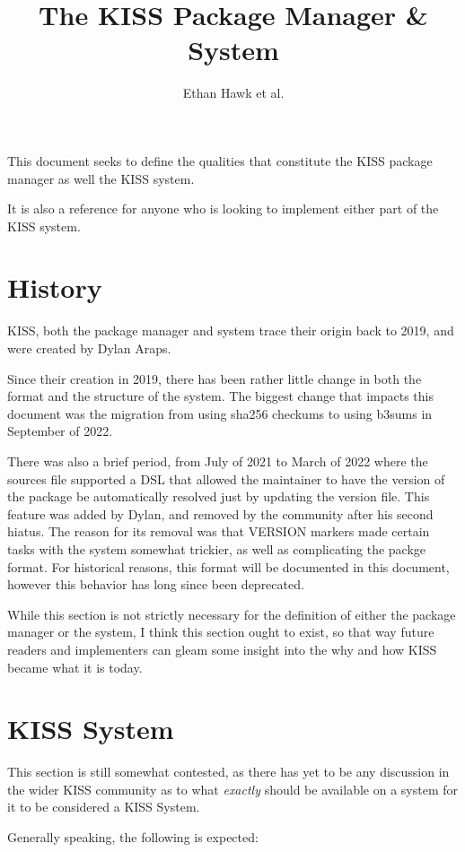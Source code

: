 \documentclass{article}
\title{The KISS Package Manager \& System}
\author{Ethan Hawk et al.}
\begin{document}
\maketitle
\tableofcontents

\newpage
This document seeks to define the qualities that constitute the
KISS package manager as well the KISS system.

It is also a reference for anyone who is looking to implement
either part of the KISS system.

\section{History}

KISS, both the package manager and system trace their origin back
to 2019, and were created by Dylan Araps.

Since their creation in 2019, there has been rather little change
in both the format and the structure of the system. The biggest
change that impacts this document was the migration from using
sha256 checkums to using b3sums in September of 2022.

There was also a brief period, from July of 2021 to March of 2022
where the sources file supported a DSL that allowed the maintainer
to have the version of the package be automatically resolved just
by updating the version file. This feature was added by Dylan,
and removed by the community after his second hiatus. The reason for
its removal was that VERSION markers made certain tasks with
the system somewhat trickier, as well as complicating the packge format.
For historical reasons, this format will be documented in this document,
however this behavior has long since been deprecated.

While this section is not strictly necessary for the definition of
either the package manager or the system, I think this section ought
to exist, so that way future readers and implementers can
gleam some insight into the why and how KISS became what it is today.

\section{KISS System}

This section is still somewhat contested, as there has yet to
be any discussion in the wider KISS community as to what
\textit{exactly} should be available on a system for it
to be considered a KISS System.

Generally speaking, the following is expected:
\end{document}
